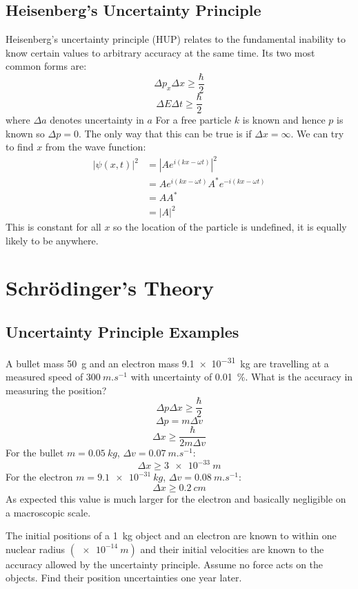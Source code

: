 \documentclass{article}
\begin{document}
    \subsection{Heisenberg's Uncertainty Principle}
    Heisenberg's uncertainty principle (HUP) relates to the fundamental inability to know certain values to arbitrary accuracy at the same time.
    Its two most common forms are:
    \[\Delta p_x\Delta x\ge \frac{\hbar}{2}\]
    \[\Delta E\Delta t\ge \frac{\hbar}{2}\]
    where \(\Delta a\) denotes uncertainty in \(a\)
    For a free particle \(k\) is known and hence \(p\) is known so \(\Delta p = 0\).
    The only way that this can be true is if \(\Delta x = \infty\).
    We can try to find \(x\) from the wave function:
    \begin{align*}
        |\psi(x, t)|^2 &= |Ae^{i(kx-\omega t)}|^2\\
        &= Ae^{i(kx-\omega t)}A^*e^{-i(kx-\omega t)}\\
        &= AA^*\\
        &= |A|^2
    \end{align*}
    This is constant for all \(x\) so the location of the particle is undefined, it is equally likely to be anywhere.
    
    \section{Schr\"odinger's Theory}
    \subsection{Uncertainty Principle Examples}
    \example
    A bullet mass \SI{50}{g} and an electron mass \SI{9.1e-31}{kg} are travelling at a measured speed of \(\SI{300}{m.s^{-1}}\) with uncertainty of \SI{0.01}{\%}.
    What is the accuracy in measuring the position?
    \[\Delta p\Delta x \ge \frac{\hbar}{2}\]
    \[\Delta p = m\Delta v\]
    \[\Delta x \ge \frac{\hbar}{2m\Delta v}\]
    For the bullet \(m = \SI{0.05}{kg}\), \(\Delta v = \SI{0.07}{m.s^{-1}}\):
    \[\Delta x \ge \SI{3e-33}{m}\]
    For the electron \(m = \SI{9.1e-31}{kg}\), \(\Delta v = \SI{0.08}{m.s^{-1}}\):
    \[\Delta x \ge \SI{0.2}{cm}\]
    As expected this value is much larger for the electron and basically negligible on a macroscopic scale.
    
    \example
    The initial positions of a \SI{1}{kg} object and an electron are known to within one nuclear radius \((\SI{e-14}{m})\) and their initial velocities are known to the accuracy allowed by the uncertainty principle.
    Assume no force acts on the objects.
    Find their position uncertainties one year later.
    
\end{document}
